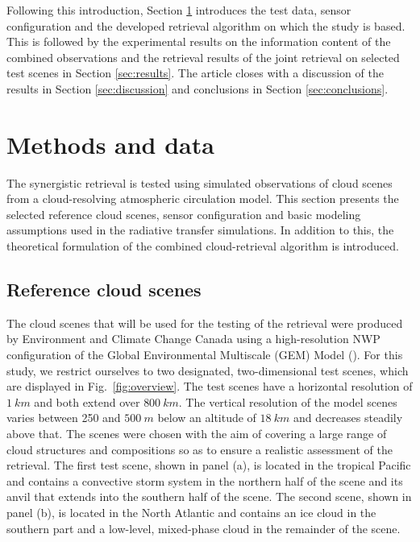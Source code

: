 \documentclass[journal abbreviation, manuscript]{copernicus}
\begin{document}
Following this introduction, Section \ref{sec:methods_and_data} introduces the
test data, sensor configuration and the developed retrieval algorithm on which
the study is based. This is followed by the experimental results on the
information content of the combined observations and the retrieval results of
the joint retrieval on selected test scenes in Section \ref{sec:results}. The
article closes with a discussion of the results in Section \ref{sec:discussion}
and conclusions in Section \ref{sec:conclusions}.


\section{Methods and data}
\label{sec:methods_and_data}

The synergistic retrieval is tested using simulated observations of cloud scenes
from a cloud-resolving atmospheric circulation model. This section presents the
selected reference cloud scenes, sensor configuration and basic modeling
assumptions used in the radiative transfer simulations. In addition to this, the
theoretical formulation of the combined cloud-retrieval algorithm is introduced.

\subsection{Reference cloud scenes}

The cloud scenes that will be used for the testing of the retrieval were
produced by Environment and Climate Change Canada using a high-resolution NWP
configuration of the Global Environmental Multiscale (GEM) Model
(\cite{cote98}). For this study, we restrict ourselves to two designated,
two-dimensional test scenes, which are displayed in Fig.~\ref{fig:overview}. The
test scenes have a horizontal resolution of $1\ \unit{km}$ and both extend over
$800\ \unit{km}$. The vertical resolution of the model scenes varies between 250
and $500\ \unit{m}$ below an altitude of $18\ \unit{km}$ and decreases
steadily above that. The scenes were chosen with the aim of covering a large
range of cloud structures and compositions so as to ensure a realistic
assessment of the retrieval. The first test scene, shown in panel (a), is
located in the tropical Pacific and contains a convective storm system in the
northern half of the scene and its anvil that extends into the southern half of
the scene. The second scene, shown in panel (b), is located in the North
Atlantic and contains an ice cloud in the southern part and a low-level,
mixed-phase cloud in the remainder of the scene.
\end{document}
